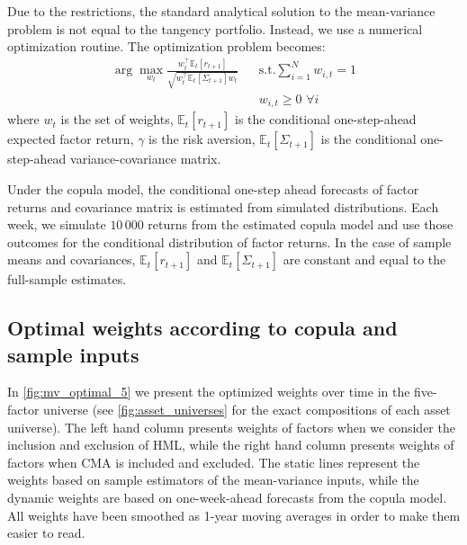 
Due to the restrictions, the standard analytical solution to the mean-variance problem is not equal to the tangency portfolio. Instead, we use a numerical optimization routine. The optimization problem becomes:
\begin{align*}
  \arg\!\max_{w_t} \frac{w_t^\top \mathbb{E}_t[r_{t+1}]}{\sqrt{w_t^\top \mathbb{E}_t[\Sigma_{t+1}] w_t}}
    && \text{s.t.} \sum_{i=1}^N w_{i,t} = 1 \\
    && w_{i,t} \ge 0 \,\, \forall i
\end{align*}
where $w_t$ is the set of weights, $\mathbb{E}_t[r_{t+1}]$ is the conditional one-step-ahead expected factor return, $\gamma$ is the risk aversion, $\mathbb{E}_t[\Sigma_{t+1}]$ is the conditional one-step-ahead variance-covariance matrix. 

Under the copula model, the conditional one-step ahead forecasts of factor returns and covariance matrix is estimated from simulated distributions. Each week, we simulate $10\,000$ returns from the estimated copula model and use those outcomes for the conditional distribution of factor returns. In the case of sample means and covariances, $\mathbb{E}_t[r_{t+1}]$ and $\mathbb{E}_t[\Sigma_{t+1}]$ are constant and equal to the full-sample estimates.

\subsection{Optimal weights according to copula and sample inputs}
In \autoref{fig:mv_optimal_5} we present the optimized weights over time in the five-factor universe (see \autoref{fig:asset_universes} for the exact compositions of each asset universe). The left hand column presents weights of factors when we consider the inclusion and exclusion of HML, while the right hand column presents weights of factors when CMA is included and excluded. The static lines represent the weights based on sample estimators of the mean-variance inputs, while the dynamic weights are based on one-week-ahead forecasts from the copula model. All weights have been smoothed as 1-year moving averages in order to make them easier to read. 

